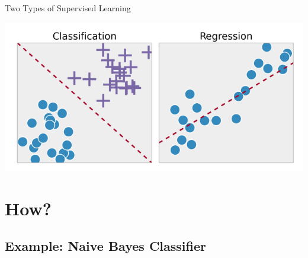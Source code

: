 \documentclass[15pt]{beamer}
\begin{document}
\begin{frame}{Two Types of Supervised Learning}
    \begin{center}
        \includegraphics[scale=.5]{img/class_regr.png}
    \end{center}
\end{frame}


\section{How?}
\subsection{Example: Naive Bayes Classifier}
\end{document}
